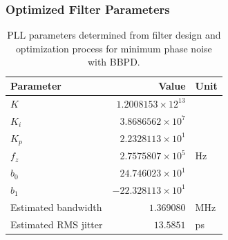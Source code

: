 	\subsubsection{Optimized Filter Parameters}
		\begin{table}[h!]
			\centering
			\def\arraystretch{1.5}		
			\setlength\arrayrulewidth{0.75pt}
			\setlength{\tabcolsep}{1em} %
			\begin{tabular}{|l|r|l|}
				\hline 
				\rule[-1ex]{0pt}{2.5ex} \cellcolor{gray!40}\textbf{Parameter} & \cellcolor{gray!40}\textbf{Value} & \cellcolor{gray!40}\textbf{Unit }\\ 
				\hline 
				\rule[-1ex]{0pt}{2.5ex} \textbf{$K$}  & $1.2008153\times12^{13}$ &  \\
				\hline 
				\rule[-1ex]{0pt}{2.5ex} \textbf{$K_i$}  & $3.8686562\times10^{7}$ &  \\
				\hline 
				\rule[-1ex]{0pt}{2.5ex} \textbf{$K_p$}  & $2.2328113\times10^{1}$ &  \\
				\hline 
				\rule[-1ex]{0pt}{2.5ex} \textbf{$f_z$}  & $2.7575807\times10^5$ & Hz\\
				\hline 
				\rule[-1ex]{0pt}{2.5ex} \textbf{$b_0$}  & $24.746023\times10^1$  &\\
				\hline 
				\rule[-1ex]{0pt}{2.5ex} \textbf{$b_1$}  & $-22.328113\times10^1$  & \\
				\hline 
				\rule[-1ex]{0pt}{2.5ex} Estimated bandwidth & $1.369080$ & MHz \\
				\hline 
				\rule[-1ex]{0pt}{2.5ex} Estimated RMS jitter & $13.5851$ & ps \\
				\hline 
			\end{tabular} 
			\caption{PLL parameters determined from filter design and optimization process for minimum phase noise with BBPD.}
			\label{filter_params_bbpd_low_noise}
		\end{table}   
